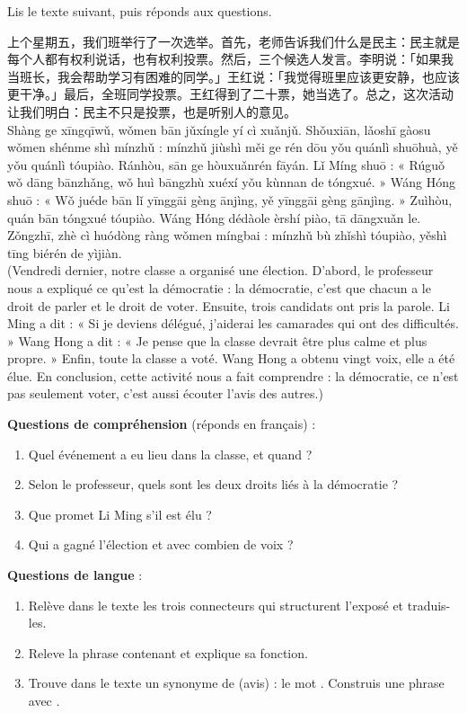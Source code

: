 \documentclass[11pt]{article}
\newcommand{\zh}[1]{\ifmmode\text{#1}\else{#1}\fi}
\begin{document}
\begin{exercice}
Lis le texte suivant, puis réponds aux questions.

\begin{textebox}
上个星期五，我们班举行了一次选举。首先，老师告诉我们什么是民主：民主就是每个人都有权利说话，也有权利投票。然后，三个候选人发言。李明说：「如果我当班长，我会帮助学习有困难的同学。」王红说：「我觉得班里应该更安静，也应该更干净。」最后，全班同学投票。王红得到了二十票，她当选了。总之，这次活动让我们明白：民主不只是投票，也是听别人的意见。\\
Shàng ge xīngqīwǔ, wǒmen bān jǔxíngle yí cì xuǎnjǔ. Shǒuxiān, lǎoshī gàosu wǒmen shénme shì mínzhǔ : mínzhǔ jiùshì měi ge rén dōu yǒu quánlì shuōhuà, yě yǒu quánlì tóupiào. Ránhòu, sān ge hòuxuǎnrén fāyán. Lǐ Míng shuō : « Rúguǒ wǒ dāng bānzhǎng, wǒ huì bāngzhù xuéxí yǒu kùnnan de tóngxué. » Wáng Hóng shuō : « Wǒ juéde bān lǐ yīnggāi gèng ānjìng, yě yīnggāi gèng gānjìng. » Zuìhòu, quán bān tóngxué tóupiào. Wáng Hóng dédàole èrshí piào, tā dāngxuǎn le. Zǒngzhī, zhè cì huódòng ràng wǒmen míngbai : mínzhǔ bù zhǐshì tóupiào, yěshì tīng biérén de yìjiàn.\\
(Vendredi dernier, notre classe a organisé une élection. D'abord, le professeur nous a expliqué ce qu'est la démocratie : la démocratie, c'est que chacun a le droit de parler et le droit de voter. Ensuite, trois candidats ont pris la parole. Li Ming a dit : « Si je deviens délégué, j'aiderai les camarades qui ont des difficultés. » Wang Hong a dit : « Je pense que la classe devrait être plus calme et plus propre. » Enfin, toute la classe a voté. Wang Hong a obtenu vingt voix, elle a été élue. En conclusion, cette activité nous a fait comprendre : la démocratie, ce n'est pas seulement voter, c'est aussi écouter l'avis des autres.)
\end{textebox}

\textbf{Questions de compréhension} (réponds en français) :
\begin{enumerate}
\item Quel événement a eu lieu dans la classe, et quand ?
\item Selon le professeur, quels sont les deux droits liés à la démocratie ?
\item Que promet Li Ming s'il est élu ?
\item Qui a gagné l'élection et avec combien de voix ?
\end{enumerate}

\textbf{Questions de langue} :
\begin{enumerate}
\item Relève dans le texte les trois connecteurs qui structurent l'exposé et traduis-les.
\item Releve la phrase contenant \zh{我觉得} et explique sa fonction.
\item Trouve dans le texte un synonyme de \zh{意见} (avis) : le mot \zh{想法}. Construis une phrase avec \zh{想法}.
\end{enumerate}
\end{exercice}
\end{document}
